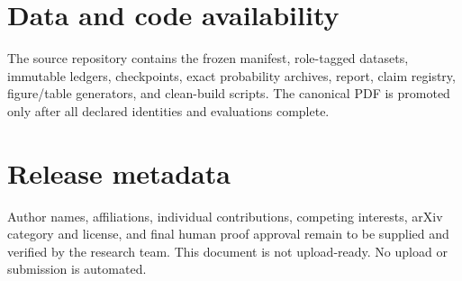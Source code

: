 \documentclass[a4paper,twocolumn,11pt,unpublished]{quantumarticle}
\begin{document}
\clearpage

\section*{Data and code availability}

The source repository contains the frozen manifest, role-tagged datasets,
immutable ledgers, checkpoints, exact probability archives, report, claim
registry, figure/table generators, and clean-build scripts.  The canonical PDF
is promoted only after all declared identities and evaluations complete.

\section*{Release metadata}

Author names, affiliations, individual contributions, competing interests,
arXiv category and license, and final human proof approval remain to be supplied
and verified by the research team.  This document is not upload-ready.  No
upload or submission is automated.

\begingroup
\small


\endgroup

\clearpage
\onecolumngrid
\appendix

\end{document}
